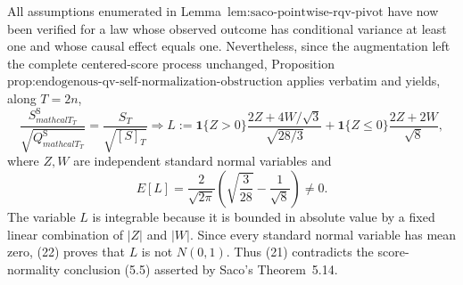 All assumptions enumerated in Lemma~\(\text{lem:saco-pointwise-rqv-pivot}\) have now been verified for a law whose observed outcome has conditional variance at least one and whose causal effect equals one.  Nevertheless, since the augmentation left the complete centered-score process unchanged, Proposition~\(\text{prop:endogenous-qv-self-normalization-obstruction}\) applies verbatim and yields, along \(T=2n\),
\[
 \frac{S_{mathcal T_T}^{\mathrm S}}{\sqrt{Q_{mathcal T_T}^{\mathrm S}}}
 =\frac{S_T}{\sqrt{[S]_T}}
 \Longrightarrow
 L:=\mathbf1\{Z>0\}\frac{2Z+4W/\sqrt3}{\sqrt{28/3}}
 +\mathbf1\{Z\le0\}\frac{2Z+2W}{\sqrt8},
\tag{21}
\]
where \(Z,W\) are independent standard normal variables and
\[
 E[L]=\frac2{\sqrt{2\pi}}
 \left(\sqrt{\frac3{28}}-\frac1{\sqrt8}\right)\ne0.
\tag{22}
\]
The variable \(L\) is integrable because it is bounded in absolute value by a fixed linear combination of \(|Z|\) and \(|W|\).  Since every standard normal variable has mean zero, (22) proves that \(L\) is not \(N(0,1)\).  Thus (21) contradicts the score-normality conclusion (5.5) asserted by Saco's Theorem~5.14.

